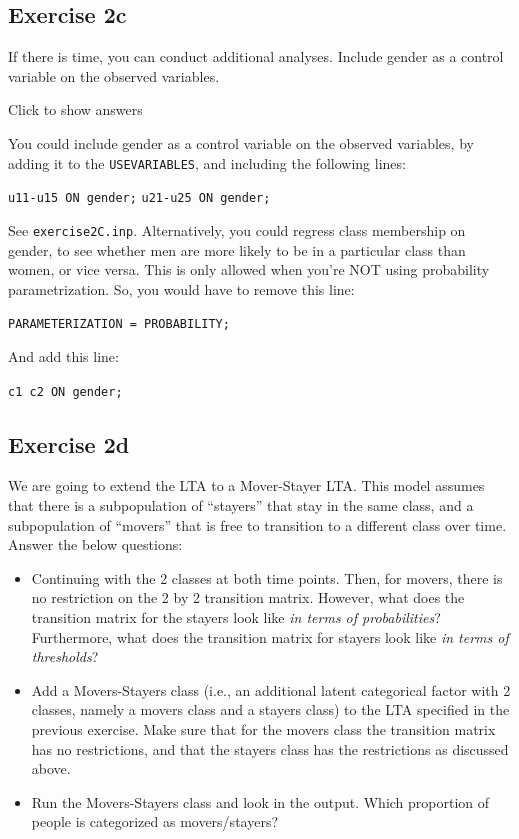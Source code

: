 \documentclass[
]{book}
\providecommand{\tightlist}{%
  \setlength{\itemsep}{0pt}\setlength{\parskip}{0pt}}
\begin{document}
\hypertarget{exercise-2c}{%
\subsection{Exercise 2c}\label{exercise-2c}}

If there is time, you can conduct additional analyses. Include gender as a control variable on the observed variables.

Click to show answers

You could include gender as a control variable on the observed variables, by adding it to the \texttt{USEVARIABLES}, and including the following lines:

\texttt{u11-u15\ ON\ gender;}
\texttt{u21-u25\ ON\ gender;}

See \texttt{exercise2C.inp}. Alternatively, you could regress class membership on gender, to see whether men are more likely to be in a particular class than women, or vice versa. This is only allowed when you're NOT using probability parametrization. So, you would have to remove this line:

\texttt{PARAMETERIZATION\ =\ PROBABILITY;}

And add this line:

\texttt{c1\ c2\ ON\ gender;}

\hypertarget{exercise-2d}{%
\subsection{Exercise 2d}\label{exercise-2d}}

We are going to extend the LTA to a Mover-Stayer LTA. This model assumes that there is a subpopulation of ``stayers'' that stay in the same class, and a subpopulation of ``movers'' that is free to transition to a different class over time. Answer the below questions:

\begin{itemize}
\tightlist
\item
  Continuing with the 2 classes at both time points. Then, for movers, there is no restriction on the 2 by 2 transition matrix. However, what does the transition matrix for the stayers look like \emph{in terms of probabilities}? Furthermore, what does the transition matrix for stayers look like \emph{in terms of thresholds}?
\item
  Add a Movers-Stayers class (i.e., an additional latent categorical factor with 2 classes, namely a movers class and a stayers class) to the LTA specified in the previous exercise. Make sure that for the movers class the transition matrix has no restrictions, and that the stayers class has the restrictions as discussed above.
\item
  Run the Movers-Stayers class and look in the output. Which proportion of people is categorized as movers/stayers?
\end{itemize}
\end{document}
